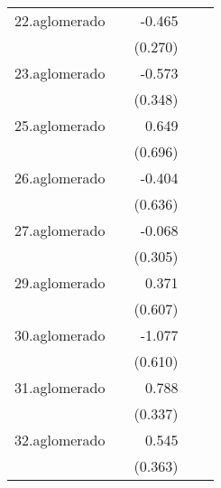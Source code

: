 {\begin{longtable}{l*{4}{D{.}{.}{-1}}}
\addlinespace
22.aglomerado&                     &      -0.465         &                     &                     \\
            &                     &     (0.270)         &                     &                     \\
\addlinespace
23.aglomerado&                     &      -0.573         &                     &                     \\
            &                     &     (0.348)         &                     &                     \\
\addlinespace
25.aglomerado&                     &       0.649         &                     &                     \\
            &                     &     (0.696)         &                     &                     \\
\addlinespace
26.aglomerado&                     &      -0.404         &                     &                     \\
            &                     &     (0.636)         &                     &                     \\
\addlinespace
27.aglomerado&                     &      -0.068         &                     &                     \\
            &                     &     (0.305)         &                     &                     \\
\addlinespace
29.aglomerado&                     &       0.371         &                     &                     \\
            &                     &     (0.607)         &                     &                     \\
\addlinespace
30.aglomerado&                     &      -1.077         &                     &                     \\
            &                     &     (0.610)         &                     &                     \\
\addlinespace
31.aglomerado&                     &       0.788\sym{*}  &                     &                     \\
            &                     &     (0.337)         &                     &                     \\
\addlinespace
32.aglomerado&                     &       0.545         &                     &                     \\
            &                     &     (0.363)         &                     &                     \\

\end{longtable}}
